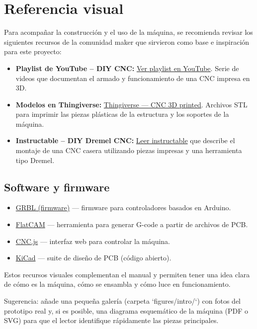 \section*{Referencia visual}
Para acompañar la construcción y el uso de la máquina, se recomienda revisar los siguientes recursos de la comunidad maker que sirvieron como base e inspiración para este proyecto:
\begin{itemize}
	\item \textbf{ Playlist de YouTube – DIY CNC:} \href{https://www.youtube.com/playlist?list=PLktKi_COpyPRVn0faQq_ZoM37WAOP8pfA}{Ver playlist en YouTube}. Serie de videos que documentan el armado y funcionamiento de una CNC impresa en 3D.
	\item \textbf{ Modelos en Thingiverse:} \href{https://www.thingiverse.com/thing:3004773}{Thingiverse — CNC 3D printed}. Archivos STL para imprimir las piezas plásticas de la estructura y los soportes de la máquina.
	\item \textbf{ Instructable – DIY Dremel CNC:} \href{https://www.instructables.com/DIY-3D-Printed-Dremel-CNC/}{Leer instructable} que describe el montaje de una CNC casera utilizando piezas impresas y una herramienta tipo Dremel.
\end{itemize}

\subsection*{Software y firmware}
\begin{itemize}
	\item \href{https://github.com/grbl/grbl}{GRBL (firmware)} — firmware para controladores basados en Arduino.
	\item \href{http://flatcam.org/}{FlatCAM} — herramienta para generar G-code a partir de archivos de PCB.
	\item \href{https://cnc.js.org/}{CNC.js} — interfaz web para controlar la máquina.
	\item \href{https://www.kicad.org/}{KiCad} — suite de diseño de PCB (código abierto).
\end{itemize}

Estos recursos visuales complementan el manual y permiten tener una idea clara de cómo es la máquina, cómo se ensambla y cómo luce en funcionamiento.

\begin{notebox}
Sugerencia: añade una pequeña galería (carpeta `figures/intro/`) con fotos del prototipo real y, si es posible, una diagrama esquemático de la máquina (PDF o SVG) para que el lector identifique rápidamente las piezas principales.
\end{notebox}

